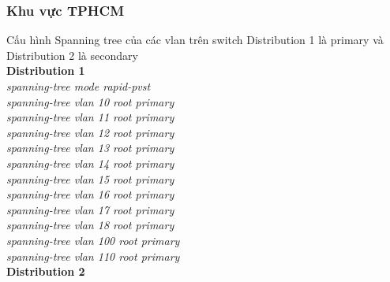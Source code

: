 \documentclass[12pt,a4paper]{report}
\begin{document}
\subsubsection{Khu vực TPHCM}
\hspace*{1cm}Cấu hình Spanning tree của các vlan trên switch Distribution 1 là primary và Distribution 2 là secondary\\
\hspace*{1cm}\textbf{Distribution 1}\\
\hspace*{2cm}\textit{spanning-tree mode rapid-pvst\\
\hspace*{2cm}spanning-tree vlan 10 root primary\\
\hspace*{2cm}spanning-tree vlan 11 root primary\\
\hspace*{2cm}spanning-tree vlan 12 root primary\\
\hspace*{2cm}spanning-tree vlan 13 root primary\\
\hspace*{2cm}spanning-tree vlan 14 root primary\\
\hspace*{2cm}spanning-tree vlan 15 root primary\\
\hspace*{2cm}spanning-tree vlan 16 root primary\\
\hspace*{2cm}spanning-tree vlan 17 root primary\\
\hspace*{2cm}spanning-tree vlan 18 root primary\\
\hspace*{2cm}spanning-tree vlan 100 root primary\\
\hspace*{2cm}spanning-tree vlan 110 root primary\\}
\hspace*{1cm}\textbf{Distribution 2}\\
\end{document}
